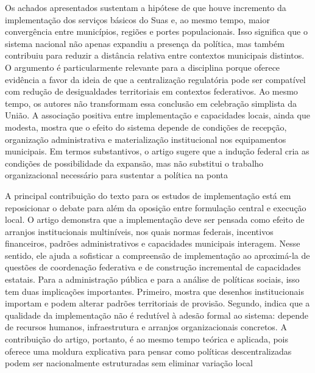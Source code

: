 \documentclass[12pt,a4paper]{article}
\begin{document}
Os achados apresentados sustentam a hipótese de que houve incremento da implementação dos serviços básicos do Suas e, ao mesmo tempo, maior convergência entre municípios, regiões e portes populacionais. Isso significa que o sistema nacional não apenas expandiu a presença da política, mas também contribuiu para reduzir a distância relativa entre contextos municipais distintos. O argumento é particularmente relevante para a disciplina porque oferece evidência a favor da ideia de que a centralização regulatória pode ser compatível com redução de desigualdades territoriais em contextos federativos. Ao mesmo tempo, os autores não transformam essa conclusão em celebração simplista da União. A associação positiva entre implementação e capacidades locais, ainda que modesta, mostra que o efeito do sistema depende de condições de recepção, organização administrativa e materialização institucional nos equipamentos municipais. Em termos substantivos, o artigo sugere que a indução federal cria as condições de possibilidade da expansão, mas não substitui o trabalho organizacional necessário para sustentar a política na ponta\parencite{bichir2020_sistemas_nacionais}

A principal contribuição do texto para os estudos de implementação está em reposicionar o debate para além da oposição entre formulação central e execução local. O artigo demonstra que a implementação deve ser pensada como efeito de arranjos institucionais multiníveis, nos quais normas federais, incentivos financeiros, padrões administrativos e capacidades municipais interagem. Nesse sentido, ele ajuda a sofisticar a compreensão de implementação ao aproximá-la de questões de coordenação federativa e de construção incremental de capacidades estatais. Para a administração pública e para a análise de políticas sociais, isso tem duas implicações importantes. Primeiro, mostra que desenhos institucionais importam e podem alterar padrões territoriais de provisão. Segundo, indica que a qualidade da implementação não é redutível à adesão formal ao sistema: depende de recursos humanos, infraestrutura e arranjos organizacionais concretos. A contribuição do artigo, portanto, é ao mesmo tempo teórica e aplicada, pois oferece uma moldura explicativa para pensar como políticas descentralizadas podem ser nacionalmente estruturadas sem eliminar variação local\parencite{bichir2020_sistemas_nacionais}
\end{document}
